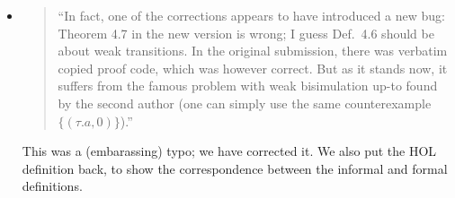 \begin{itemize}
\item \begin{quote}
    ``In fact, one of the corrections appears to have introduced a new
    bug: Theorem 4.7 in the new version is wrong; I guess Def.~4.6
    should be about weak transitions. In the original submission,
    there was verbatim copied proof code, which was however
    correct. But as it stands now, it suffers from the famous problem
    with weak bisimulation up-to found by the second author (one can
    simply use the same counterexample $\{(\tau. a , 0)\}$).''
  \end{quote}
  \Mark
  This was a (embarassing) typo; we have corrected it. 
We also put the HOL definition back, to show the correspondence between the informal and formal definitions.




 



\end{itemize}
